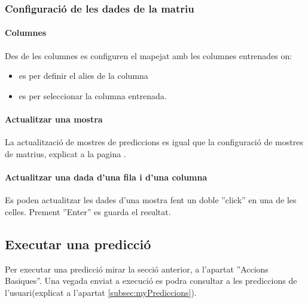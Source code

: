 \subsubsection{Configuració de les dades de la matriu}
\paragraph{Columnes} Des de les columnes es configuren el mapejat amb les columnes entrenades on:
\begin{itemize}
\item \iconalias es per definir el alies de la columna
\item \iconvariable es per seleccionar la columna entrenada.
\end{itemize}

\paragraph*{Actualitzar una mostra} La actualització de mostres de prediccions es igual que la configuració de mostres de matrius, explicat a la pagina \pageref{matrixConfiguration}.

\paragraph*{Actualitzar una dada d'una fila i d'una columna} Es poden actualitzar les dades d'una mostra fent un doble ''click'' en una de les celles. Prement ''Enter'' es guarda el resultat.

\subsection{Executar una predicció}
Per executar una predicció mirar la secció anterior, a l'apartat ''Accions Basiques''. Una vegada enviat a execució es podra consultar a les prediccions de l'usuari(explicat a l'apartat \ref{subsec:myPrediccions}).

